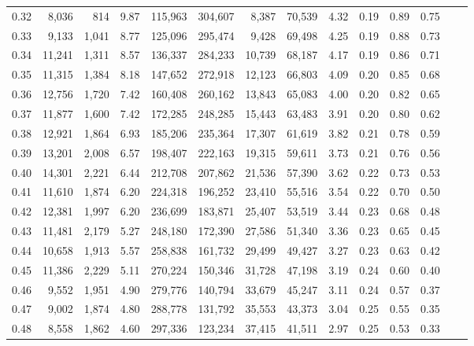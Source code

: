\begin{tabular}{rrrrrrrrrrrrrr}
0.32 &   8,036 &    814 &    9.87 &  115,963 &  304,607 &   8,387 &  70,539 &  4.32 &  0.19 &  0.89 &      0.75 \\
0.33 &   9,133 &  1,041 &    8.77 &  125,096 &  295,474 &   9,428 &  69,498 &  4.25 &  0.19 &  0.88 &      0.73 \\
0.34 &  11,241 &  1,311 &    8.57 &  136,337 &  284,233 &  10,739 &  68,187 &  4.17 &  0.19 &  0.86 &      0.71 \\
0.35 &  11,315 &  1,384 &    8.18 &  147,652 &  272,918 &  12,123 &  66,803 &  4.09 &  0.20 &  0.85 &      0.68 \\
0.36 &  12,756 &  1,720 &    7.42 &  160,408 &  260,162 &  13,843 &  65,083 &  4.00 &  0.20 &  0.82 &      0.65 \\
0.37 &  11,877 &  1,600 &    7.42 &  172,285 &  248,285 &  15,443 &  63,483 &  3.91 &  0.20 &  0.80 &      0.62 \\
0.38 &  12,921 &  1,864 &    6.93 &  185,206 &  235,364 &  17,307 &  61,619 &  3.82 &  0.21 &  0.78 &      0.59 \\
0.39 &  13,201 &  2,008 &    6.57 &  198,407 &  222,163 &  19,315 &  59,611 &  3.73 &  0.21 &  0.76 &      0.56 \\
0.40 &  14,301 &  2,221 &    6.44 &  212,708 &  207,862 &  21,536 &  57,390 &  3.62 &  0.22 &  0.73 &      0.53 \\
0.41 &  11,610 &  1,874 &    6.20 &  224,318 &  196,252 &  23,410 &  55,516 &  3.54 &  0.22 &  0.70 &      0.50 \\
0.42 &  12,381 &  1,997 &    6.20 &  236,699 &  183,871 &  25,407 &  53,519 &  3.44 &  0.23 &  0.68 &      0.48 \\
0.43 &  11,481 &  2,179 &    5.27 &  248,180 &  172,390 &  27,586 &  51,340 &  3.36 &  0.23 &  0.65 &      0.45 \\
0.44 &  10,658 &  1,913 &    5.57 &  258,838 &  161,732 &  29,499 &  49,427 &  3.27 &  0.23 &  0.63 &      0.42 \\
0.45 &  11,386 &  2,229 &    5.11 &  270,224 &  150,346 &  31,728 &  47,198 &  3.19 &  0.24 &  0.60 &      0.40 \\
0.46 &   9,552 &  1,951 &    4.90 &  279,776 &  140,794 &  33,679 &  45,247 &  3.11 &  0.24 &  0.57 &      0.37 \\
0.47 &   9,002 &  1,874 &    4.80 &  288,778 &  131,792 &  35,553 &  43,373 &  3.04 &  0.25 &  0.55 &      0.35 \\
0.48 &   8,558 &  1,862 &    4.60 &  297,336 &  123,234 &  37,415 &  41,511 &  2.97 &  0.25 &  0.53 &      0.33 \\

\end{tabular}
